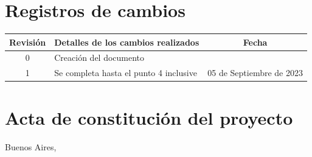 \documentclass[
11pt, %
codirector, %
]{charter}
\begin{document}
\maketitle
\thispagestyle{empty}
\pagebreak


\thispagestyle{empty}
{\setlength{\parskip}{0pt}
	\tableofcontents{}
}
\pagebreak


\section*{Registros de cambios}
\label{sec:registro}


\begin{table}[ht]
	\label{tab:registro}
	\centering
	\begin{tabularx}{\linewidth}{@{}|c|X|c|@{}}
		\hline
		\rowcolor[HTML]{C0C0C0}
		Revisión & \multicolumn{1}{c|}{\cellcolor[HTML]{C0C0C0}Detalles de los cambios realizados} & Fecha                    \\ \hline
		0        & Creación del documento                                                          & \fechaInicioName         \\ \hline
		1        & Se completa hasta el punto 4 inclusive                                          & 05 de Septiembre de 2023 \\ \hline
	\end{tabularx}
\end{table}

\pagebreak


\section*{Acta de constitución del proyecto}
\label{sec:acta}

\begin{flushright}
	Buenos Aires, \fechaInicioName
\end{flushright}

\vspace{2cm}
\end{document}
